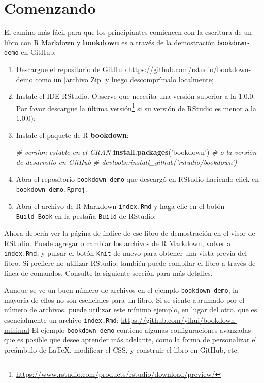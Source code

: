 \documentclass[12pt,]{krantz}
\makeatletter
\newenvironment{Shaded}{\begin{snugshade}}{\end{snugshade}}
\newcommand{\KeywordTok}[1]{\textcolor[rgb]{0.13,0.29,0.53}{\textbf{{#1}}}}
\newcommand{\StringTok}[1]{\textcolor[rgb]{0.31,0.60,0.02}{{#1}}}
\newcommand{\CommentTok}[1]{\textcolor[rgb]{0.56,0.35,0.01}{\textit{{#1}}}}
\newcommand{\NormalTok}[1]{{#1}}
\renewcommand{\href}[2]{#2\footnote{\url{#1}}}
\newenvironment{kframe}{%
\medskip{}
\setlength{\fboxsep}{.8em}
 \def\at@end@of@kframe{}%
 \ifinner\ifhmode%
  \def\at@end@of@kframe{\end{minipage}}%
  \begin{minipage}{\columnwidth}%
 \fi\fi%
 \def\FrameCommand##1{\hskip\@totalleftmargin \hskip-\fboxsep
 \colorbox{shadecolor}{##1}\hskip-\fboxsep
     \hskip-\linewidth \hskip-\@totalleftmargin \hskip\columnwidth}%
 \MakeFramed {\advance\hsize-\width
   \@totalleftmargin\z@ \linewidth\hsize
   \@setminipage}}%
 {\par\unskip\endMakeFramed%
 \at@end@of@kframe}
\renewenvironment{Shaded}{\begin{kframe}}{\end{kframe}}
\theoremstyle{definition}
\theoremstyle{definition}
\theoremstyle{remark}
\makeatother
\begin{document}
\section{Comenzando}\label{comenzando}

El camino más fácil para que los principiantes comiencen con la
escritura de un libro con R Markdown y \textbf{bookdown} es a través de
la demostración \texttt{bookdown-demo} en GitHub:

\begin{enumerate}
\def\labelenumi{\arabic{enumi}.}
\item
  Descargue el repositorio de GitHub
  \url{https://github.com/rstudio/bookdown-demo} como un {[}archivo
  Zip{]} y luego descomprímalo localmente;
\item
  Instale el IDE RStudio. Observe que necesita una versión superior a la
  1.0.0. Por favor
  \href{https://www.rstudio.com/products/rstudio/download/preview/}{descargue
  la última versión} si su versión de RStudio es menor a la 1.0.0);
\item
  Instale el paquete de R \textbf{bookdown}:

\begin{Shaded}
\begin{Highlighting}[]
\CommentTok{# version estable en el CRAN}
\KeywordTok{install.packages}\NormalTok{(}\StringTok{'bookdown'}\NormalTok{)}
\CommentTok{# o la versión de desarrollo en GitHub}
\CommentTok{# devtools::install_github('rstudio/bookdown')}
\end{Highlighting}
\end{Shaded}
\item
  Abra el repositorio \texttt{bookdown-demo} que descargó en RStudio
  haciendo click en \texttt{bookdown-demo.Rproj}.
\item
  Abra el archivo de R Markdown \texttt{index.Rmd} y haga clic en el
  botón \texttt{Build\ Book} en la pestaña \texttt{Build} de RStudio;
\end{enumerate}

Ahora debería ver la página de índice de ese libro de demostración en el
visor de RStudio. Puede agregar o cambiar los archivos de R Markdown,
volver a \texttt{index.Rmd}, y pulsar el botón \texttt{Knit} de nuevo
para obtener una vista previa del libro. Si prefiere no utilizar
RStudio, también puede compilar el libro a través de línea de comandos.
Consulte la siguiente sección para más detalles.

Aunque se ve un buen número de archivos en el ejemplo
\texttt{bookdown-demo}, la mayoría de ellos no son esenciales para un
libro. Si se siente abrumado por el número de archivos, puede utilizar
este mínimo ejemplo, en lugar del otro, que es esencialmente un archivo
\texttt{index.Rmd}: \url{https://github.com/yihui/bookdown-minimal} El
ejemplo \texttt{bookdown-demo} contiene algunas configuraciones
avanzadas que es posible que desee aprender más adelante, como la forma
de personalizar el preámbulo de LaTeX, modificar el CSS, y construir el
libro en GitHub, etc.
\end{document}
